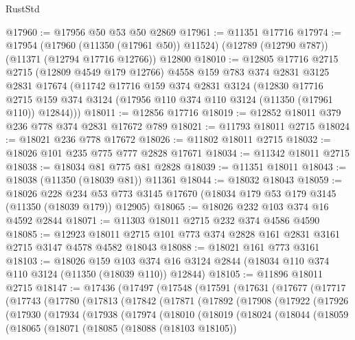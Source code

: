\begin{lexlean}{RustStd}
\begin{coremodule}
@17960 := @17956 @50 @53 @50 @2869
@17961 := @11351 @17716
@17974 := @17954
    (@17960 (@11350 (@17961 @50)) @11524)
    (@12789 (@12790 @787))
    (@11371 (@12794 @17716 @12766))
    @12800
@18010 := @12805
    @17716
    @2715
    @2715
    (@12809 @4549 @179 @12766)
    @4558
    @159
    @783
    @374
    @2831
    @3125
    @2831
    @17674
    (@11742
      @17716
      @159
      @374
      @2831
      @3124
      (@12830
        @17716
        @2715
        @159
        @374
        @3124
        (@17956 @110 @374 @110 @3124 (@11350 (@17961 @110)) @12844)))
@18011 := @12856 @17716
@18019 := @12852 @18011 @379 @236 @778 @374 @2831 @17672 @789
@18021 := @11793 @18011 @2715
@18024 := @18021 @236 @778 @17672
@18026 := @11802 @18011 @2715
@18032 := @18026 @101 @235 @775 @777 @2828 @17671
@18034 := @11342 @18011 @2715
@18038 := @18034 @81 @775 @81 @2828
@18039 := @11351 @18011
@18043 := @18038 (@11350 (@18039 @81)) @11361
@18044 := @18032 @18043
@18059 := @18026
    @228
    @234
    @53
    @773
    @3145
    @17670
    (@18034 @179 @53 @179 @3145 (@11350 (@18039 @179)) @12905)
@18065 := @18026 @232 @103 @374 @16 @4592 @2844
@18071 := @11303 @18011 @2715 @232 @374 @4586 @4590
@18085 := @12923 @18011 @2715 @101 @773 @374 @2828 @161 @2831 @3161 @2715 @3147 @4578 @4582 @18043
@18088 := @18021 @161 @773 @3161
@18103 := @18026
    @159
    @103
    @374
    @16
    @3124
    @2844
    (@18034 @110 @374 @110 @3124 (@11350 (@18039 @110)) @12844)
@18105 := @11896 @18011 @2715
@18147 := @17436
    (@17497
      (@17548
        (@17591
          (@17631
            (@17677
              (@17717
                (@17743
                  (@17780
                    (@17813
                      (@17842
                        (@17871
                          (@17892
                            (@17908
                              (@17922
                                (@17926
                                  (@17930
                                    (@17934
                                      (@17938
                                        (@17974
                                          (@18010
                                            (@18019
                                              (@18024
                                                (@18044
                                                  (@18059
                                                    (@18065
                                                      (@18071
                                                        (@18085
                                                          (@18088 (@18103 @18105))

\end{coremodule}
\end{lexlean}
